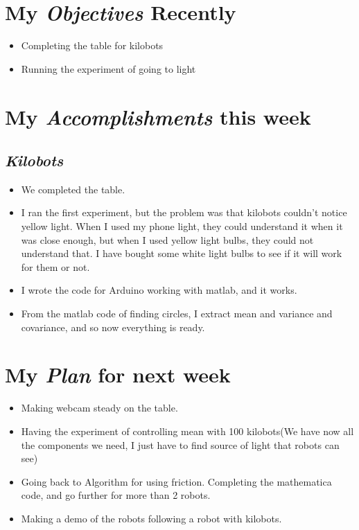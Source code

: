 \newcommand{\handoutName}{Weekly report}
\newcommand{\handoutdate}{\today}


\section{My \emph{Objectives} Recently}
\begin{itemize}
\item Completing the table for kilobots
\item Running the experiment of going to light
\end{itemize}



\section{My \emph{Accomplishments} this week}

\subsection{\emph{Kilobots}}

\begin{itemize}
\item We completed the table.
\item I ran the first experiment, but the problem was that kilobots couldn't notice yellow light. When I used my phone light, they could understand it when it was close enough, but when I used yellow light bulbs, they could not understand that. I have bought some white light bulbs to see if it will work for them or not.
\item I wrote the code for Arduino working with matlab, and it works.
\item From the matlab code of finding circles, I extract mean and variance and covariance, and so now everything is ready.

\end{itemize}





\section{My \emph{Plan} for next week}

\begin{itemize}
\item Making webcam steady on the table.
\item Having the experiment of controlling mean with 100 kilobots(We have now all the components we need, I just have to find source of light that robots can see)
\item Going back to Algorithm for using friction. Completing the mathematica code, and go further for more than 2 robots. 
\item Making a demo of the robots following a robot with kilobots.

\end{itemize}


